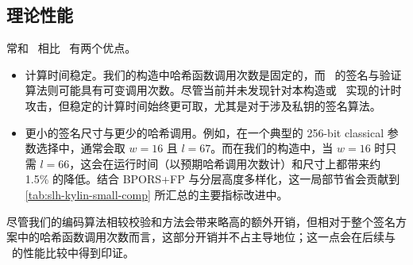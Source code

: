 \subsection{理论性能}
常和 \WOTSP\ 相比 \WOTSP\ 有两个优点。
\begin{itemize}
    \item 计算时间稳定。我们的构造中哈希函数调用次数是固定的，而 \WOTSP\ 的签名与验证算法则可能具有可变调用次数。尽管当前并未发现针对本构造或 \WOTSP\ 实现的计时攻击，但稳定的计算时间始终更可取，尤其是对于涉及私钥的签名算法。
    \item 更小的签名尺寸与更少的哈希调用。例如，在一个典型的 256-bit classical 参数选择中，通常会取 $w=16$ 且 $l=67$。而在我们的构造中，当 $w=16$ 时只需 $l=66$，这会在运行时间（以预期哈希调用次数计）和尺寸上都带来约 1.5\% 的降低。结合 BPORS+FP 与分层高度多样化，这一局部节省会贡献到 \cref{tab:slh-kylin-small-comp} 所汇总的主要指标改进中。
\end{itemize}

尽管我们的编码算法相较校验和方法会带来略高的额外开销，但相对于整个签名方案中的哈希函数调用次数而言，这部分开销并不占主导地位；这一点会在后续与 \SPHINCSP\ 的性能比较中得到印证。
